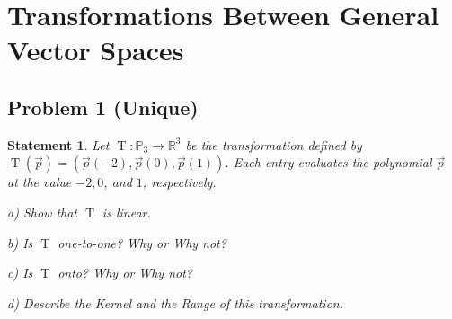 \documentclass[12pt, letterpaper]{article}
\newcommand{\R}{\mathbb{R}}
\theoremstyle{statement}
\theoremstyle{statement}
\newtheorem*{atmStat}{Statement}
\newcommand{\func}[2]{\operatorname{#1}(#2)}
\newcommand{\trans}[2]{\func{#1}{\Vec{#2}}}
\begin{document}
    \section*{Transformations Between General Vector Spaces}
    \subsection*{Problem 1 (Unique)}
    \begin{atmStat}
    Let $\operatorname{T}:\mathbb{P}_3\longrightarrow\R^3$ be the transformation defined by $\trans{T}{p}=\left(\Vec{p}(-2), \Vec{p}(0), \Vec{p}(1)\right)$. Each entry evaluates the polynomial $\Vec{p}$ at the value $-2,0$, and $1$, respectively.
    
    a) Show that $\operatorname{T}$ is linear.
    
    b) Is $\operatorname{T}$ one-to-one? Why or Why not?
    
    c) Is $\operatorname{T}$ onto? Why or Why not?
    
    d) Describe the Kernel and the Range of this transformation.
    
    \end{atmStat}
\end{document}
